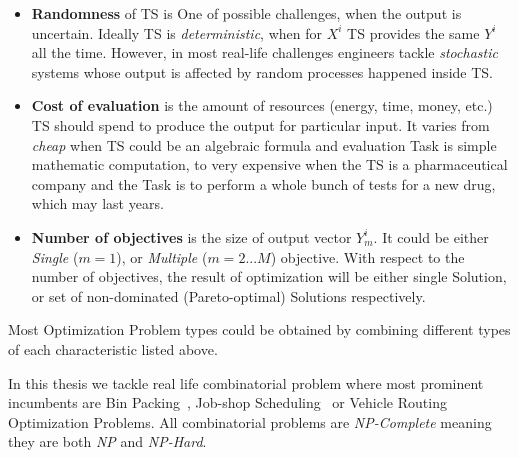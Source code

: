 \begin{itemize}[itemsep=8pt]
	\item \textbf{Randomness} of TS is One of possible challenges, when the output is uncertain. Ideally TS is \textit{deterministic}, when for $X^i$ TS provides the same $Y^i$ all the time. However, in most real-life challenges engineers tackle \textit{stochastic} systems whose output is affected by random processes happened inside TS. 

	\item \textbf{Cost of evaluation} is the amount of resources (energy, time, money, etc.) TS should spend to produce the output for particular input. It varies from \textit{cheap} when TS could be an algebraic formula and evaluation Task is simple mathematic computation, to very expensive when the TS is a pharmaceutical company and the Task is to perform a whole bunch of tests for a new drug, which may last years. 

	\item \textbf{Number of objectives} is the size of output vector $Y_m^i$. It could be either \textit{Single} ($m=1$), or \textit{Multiple} ($m=2...M$) objective. With respect to the number of objectives, the result of optimization will be either single Solution, or set of non-dominated (Pareto-optimal) Solutions respectively.
\end{itemize}

Most Optimization Problem types could be obtained by combining different types of each characteristic listed above.

In this thesis we tackle real life combinatorial problem where most prominent incumbents are Bin Packing~\cite{martello1990bin}, Job-shop Scheduling~\cite{blazewicz1996job} or Vehicle Routing~\cite{toth2002vehicle} Optimization Problems.
All combinatorial problems are \textit{NP-Complete} meaning they are both \textit{NP} and \textit{NP-Hard}\cite{garey1979computers}.


